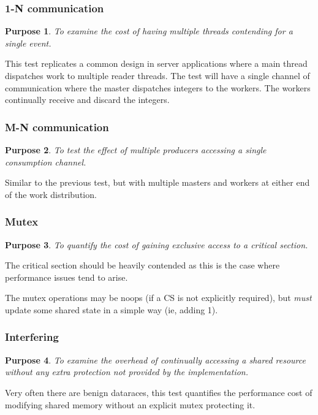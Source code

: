\documentclass{beamer}
\newtheorem{purpose}{Purpose}
\newcommand{\skipp}[0]{\vskip 0.5cm}
\begin{document}
\begin{frame}
  \frametitle{1-N communication}
  \begin{purpose}
    To examine the cost of having multiple threads contending for a single event.
  \end{purpose}
  
  This test replicates a common design in server applications where a main thread
  dispatches work to multiple reader threads.
  \skipp
  The test will have a single channel of communication where the master
  dispatches integers to the workers.
  The workers continually receive and discard the integers.
\end{frame}

\begin{frame}
  \frametitle{M-N communication}
  \begin{purpose}
    To test the effect of multiple producers accessing a single consumption channel.
  \end{purpose}

  Similar to the previous test, but with multiple masters and workers at either end
  of the work distribution.
\end{frame}

\begin{frame}
  \frametitle{Mutex}
  \begin{purpose}
    To quantify the cost of gaining exclusive access to a critical section.
  \end{purpose}

  The critical section should be heavily contended as this is the case where
  performance issues tend to arise.

  The mutex operations may be noops (if a CS is not explicitly required),
  but \emph{must} update some shared state in a simple way (ie, adding 1).
\end{frame}

\begin{frame}
  \frametitle{Interfering}
  \begin{purpose}
    To examine the overhead of continually accessing a shared resource without
    any extra protection not provided by the implementation.
  \end{purpose}

  Very often there are benign dataraces, this test quantifies the performance
  cost of modifying shared memory without an explicit mutex protecting it.
\end{frame}
\end{document}
